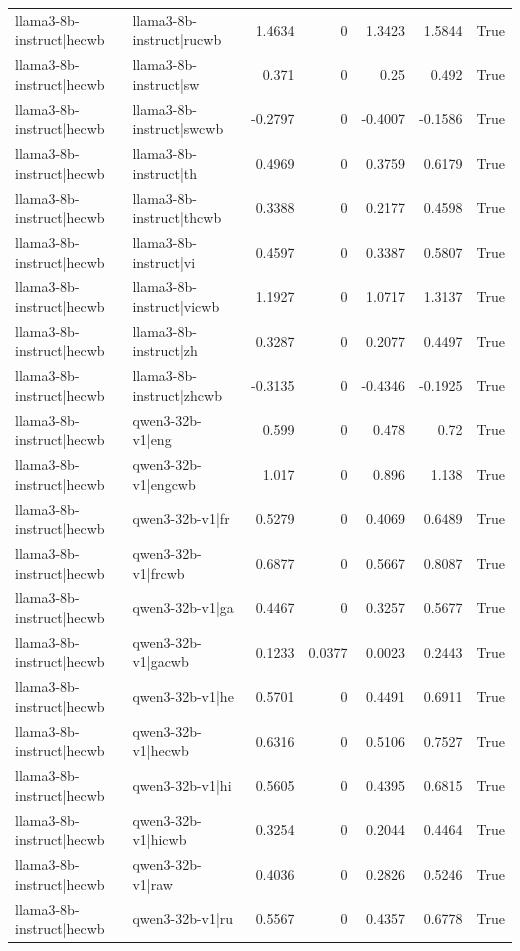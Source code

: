 \begin{table}
\begin{tabular}{l l r r r r l}
llama3-8b-instruct|hecwb & llama3-8b-instruct|rucwb & 1.4634 & 0 & 1.3423 & 1.5844 & True \\
llama3-8b-instruct|hecwb & llama3-8b-instruct|sw & 0.371 & 0 & 0.25 & 0.492 & True \\
llama3-8b-instruct|hecwb & llama3-8b-instruct|swcwb & -0.2797 & 0 & -0.4007 & -0.1586 & True \\
llama3-8b-instruct|hecwb & llama3-8b-instruct|th & 0.4969 & 0 & 0.3759 & 0.6179 & True \\
llama3-8b-instruct|hecwb & llama3-8b-instruct|thcwb & 0.3388 & 0 & 0.2177 & 0.4598 & True \\
llama3-8b-instruct|hecwb & llama3-8b-instruct|vi & 0.4597 & 0 & 0.3387 & 0.5807 & True \\
llama3-8b-instruct|hecwb & llama3-8b-instruct|vicwb & 1.1927 & 0 & 1.0717 & 1.3137 & True \\
llama3-8b-instruct|hecwb & llama3-8b-instruct|zh & 0.3287 & 0 & 0.2077 & 0.4497 & True \\
llama3-8b-instruct|hecwb & llama3-8b-instruct|zhcwb & -0.3135 & 0 & -0.4346 & -0.1925 & True \\
llama3-8b-instruct|hecwb & qwen3-32b-v1|eng & 0.599 & 0 & 0.478 & 0.72 & True \\
llama3-8b-instruct|hecwb & qwen3-32b-v1|engcwb & 1.017 & 0 & 0.896 & 1.138 & True \\
llama3-8b-instruct|hecwb & qwen3-32b-v1|fr & 0.5279 & 0 & 0.4069 & 0.6489 & True \\
llama3-8b-instruct|hecwb & qwen3-32b-v1|frcwb & 0.6877 & 0 & 0.5667 & 0.8087 & True \\
llama3-8b-instruct|hecwb & qwen3-32b-v1|ga & 0.4467 & 0 & 0.3257 & 0.5677 & True \\
llama3-8b-instruct|hecwb & qwen3-32b-v1|gacwb & 0.1233 & 0.0377 & 0.0023 & 0.2443 & True \\
llama3-8b-instruct|hecwb & qwen3-32b-v1|he & 0.5701 & 0 & 0.4491 & 0.6911 & True \\
llama3-8b-instruct|hecwb & qwen3-32b-v1|hecwb & 0.6316 & 0 & 0.5106 & 0.7527 & True \\
llama3-8b-instruct|hecwb & qwen3-32b-v1|hi & 0.5605 & 0 & 0.4395 & 0.6815 & True \\
llama3-8b-instruct|hecwb & qwen3-32b-v1|hicwb & 0.3254 & 0 & 0.2044 & 0.4464 & True \\
llama3-8b-instruct|hecwb & qwen3-32b-v1|raw & 0.4036 & 0 & 0.2826 & 0.5246 & True \\
llama3-8b-instruct|hecwb & qwen3-32b-v1|ru & 0.5567 & 0 & 0.4357 & 0.6778 & True \\

\end{tabular}
\end{table}

